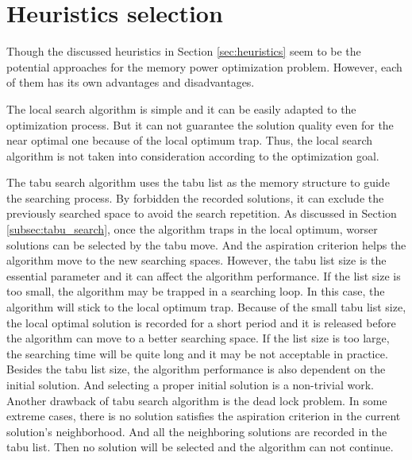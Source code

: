 	\section{Heuristics selection}
	\label{sec:heuristics_selection}
	Though the discussed heuristics in Section \ref{sec:heuristics} seem to
	be the potential approaches for the memory power optimization problem.
	However, each of them has its own advantages and disadvantages.
	
	The local search algorithm is simple and it can be easily adapted to the
	optimization process. But it can not guarantee the solution quality
	even for the near optimal one because of the local optimum trap. Thus,
	the local search algorithm is not taken into consideration according
	to the optimization goal.
	
	The tabu search algorithm uses the tabu list as the memory structure to
	guide the searching process. By forbidden the recorded solutions, it can
	exclude the previously searched space to avoid the search repetition.
	As discussed in Section \ref{subsec:tabu_search}, once the algorithm
	traps in the local optimum, worser solutions can be selected by the
	tabu move. And the aspiration criterion helps the algorithm move to the new
	searching spaces.
	However, the tabu list size is the essential parameter
	and it can affect the algorithm performance. If the list size is too
	small, the algorithm may be trapped in a searching loop. In this case,
	the algorithm will stick to the local optimum trap. Because of the small
	tabu list size, the local optimal solution is recorded for a short
	period and it is released before the algorithm can move to a better
	searching space. If the list size is too large, the searching time will
	be quite long and it may be not acceptable in practice. Besides the tabu
	list size, the algorithm performance is also dependent on the initial
	solution. And selecting a proper initial solution is a non-trivial work.	
	Another drawback of tabu search algorithm is the dead lock problem.
	In some extreme cases, there is no solution satisfies the aspiration
	criterion in the current solution's neighborhood. And all the neighboring
	solutions are recorded in the tabu list. Then no solution will be selected
	and the algorithm can not continue.
	
